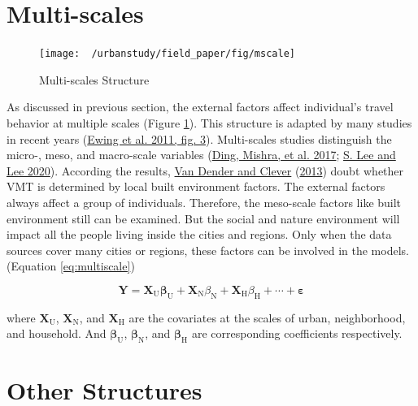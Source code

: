 \documentclass[
  11pt,
  openany]{memoir}
\begin{document}
\hypertarget{multi-scales}{%
\section{Multi-scales}\label{multi-scales}}

\begin{figure}

{\centering \texttt{[image: ~/urbanstudy/field\_paper/fig/mscale]} 

}

\caption{Multi-scales Structure}\label{fig:Mscale}
\end{figure}

As discussed in previous section, the external factors affect individual's travel behavior at multiple scales (Figure \ref{fig:Mscale}).
This structure is adapted by many studies in recent years (\protect\hyperlink{ref-ewingTrafficGeneratedMixedUse2011}{Ewing et al. 2011, fig. 3}).
Multi-scales studies distinguish the micro-, meso, and macro-scale variables (\protect\hyperlink{ref-dingInfluencesBuiltEnvironment2017}{Ding, Mishra, et al. 2017}; \protect\hyperlink{ref-leeComparingImpactsLocal2020}{S. Lee and Lee 2020}).
According the results, \protect\hyperlink{ref-van2013recent}{Van Dender and Clever} (\protect\hyperlink{ref-van2013recent}{2013}) doubt whether VMT is determined by local built environment factors.
The external factors always affect a group of individuals. Therefore, the meso-scale factors like built environment still can be examined. But the social and nature environment will impact all the people living inside the cities and regions.
Only when the data sources cover many cities or regions, these factors can be involved in the models.(Equation \eqref{eq:multiscale})

\begin{equation}
\label{eq:multiscale}
\mathbf{Y}=\mathbf{X}_\mathrm{U}\boldsymbol{\beta}_\mathrm{U}+\mathbf{X}_\mathrm{N}{\beta}_\mathrm{N}+\mathbf{X}_\mathrm{H}{\beta}_\mathrm{H}+\cdots+\boldsymbol{\varepsilon}
\end{equation}

where \(\mathbf{X}_\mathrm{U}\), \(\mathbf{X}_\mathrm{N}\), and \(\mathbf{X}_\mathrm{H}\) are the covariates at the scales of urban, neighborhood, and household. And \(\boldsymbol{\beta}_\mathrm{U}\), \(\boldsymbol{\beta}_\mathrm{N}\), and \(\boldsymbol{\beta}_\mathrm{H}\) are corresponding coefficients respectively.

\hypertarget{other-structures}{%
\section{Other Structures}\label{other-structures}}
\end{document}
